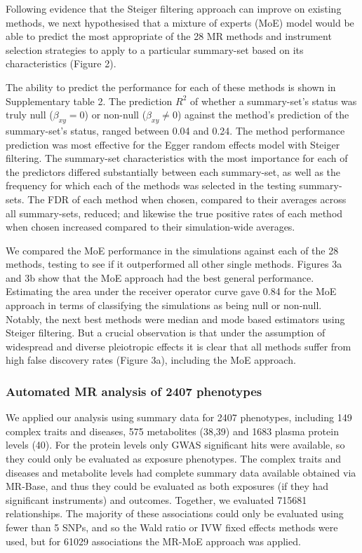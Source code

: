 \documentclass[]{article}
\begin{document}
Following evidence that the Steiger filtering approach can improve on
existing methods, we next hypothesised that a mixture of experts (MoE)
model would be able to predict the most appropriate of the 28 MR methods
and instrument selection strategies to apply to a particular summary-set
based on its characteristics (Figure 2).

The ability to predict the performance for each of these methods is
shown in Supplementary table 2. The prediction \(R^2\) of whether a
summary-set's status was truly null (\(\beta_{xy}=0\)) or non-null
(\(\beta_{xy} \neq 0\)) against the method's prediction of the
summary-set's status, ranged between 0.04 and 0.24. The method
performance prediction was most effective for the Egger random effects
model with Steiger filtering. The summary-set characteristics with the
most importance for each of the predictors differed substantially
between each summary-set, as well as the frequency for which each of the
methods was selected in the testing summary-sets. The FDR of each method
when chosen, compared to their averages across all summary-sets,
reduced; and likewise the true positive rates of each method when chosen
increased compared to their simulation-wide averages.

We compared the MoE performance in the simulations against each of the
28 methods, testing to see if it outperformed all other single methods.
Figures 3a and 3b show that the MoE approach had the best general
performance. Estimating the area under the receiver operator curve gave
0.84 for the MoE approach in terms of classifying the simulations as
being null or non-null. Notably, the next best methods were median and
mode based estimators using Steiger filtering. But a crucial observation
is that under the assumption of widespread and diverse pleiotropic
effects it is clear that all methods suffer from high false discovery
rates (Figure 3a), including the MoE approach.

\subsubsection{Automated MR analysis of 2407
phenotypes}\label{automated-mr-analysis-of-2407-phenotypes}

We applied our analysis using summary data for 2407 phenotypes,
including 149 complex traits and diseases, 575 metabolites (38,39) and
1683 plasma protein levels (40). For the protein levels only GWAS
significant hits were available, so they could only be evaluated as
exposure phenotypes. The complex traits and diseases and metabolite
levels had complete summary data available obtained via MR-Base, and
thus they could be evaluated as both exposures (if they had significant
instruments) and outcomes. Together, we evaluated 715681 relationships.
The majority of these associations could only be evaluated using fewer
than 5 SNPs, and so the Wald ratio or IVW fixed effects methods were
used, but for 61029 associations the MR-MoE approach was applied.
\end{document}
